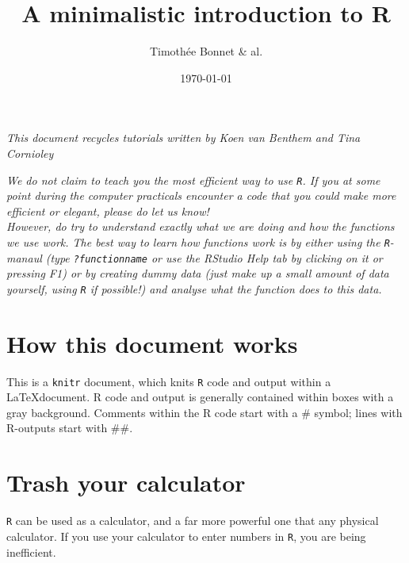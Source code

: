 \documentclass[12pt,a4paper]{scrartcl}\usepackage[]{graphicx}\usepackage[]{color}
\title{A minimalistic introduction to R}
\date{\today}
\author{Timothée Bonnet \& al.}
\begin{document}
\maketitle

\textit{This document recycles tutorials written by Koen van Benthem and Tina Cornioley}

\tableofcontents



\vspace{2cm}
\begin{mdframed}
\textit{We do not claim to teach you the most efficient way to use \texttt{R}. If you at some point during the computer practicals encounter a code that you could make more efficient or elegant, please do let us know! \\[1.5ex] 
However, do try to understand exactly what we are doing and how the functions we use work. The best way to learn how functions work is by either using the \texttt{R}-manaul (type \texttt{?functionname} or use the RStudio Help tab by clicking on it or pressing F1) or by creating dummy data (just make up a small amount of data yourself, using \texttt{R} if possible!) and analyse what the function does to this data.}
\end{mdframed}
\newpage

\section*{How this document works}
This is a \texttt{knitr} document, which knits \texttt{R} code and output within a \LaTeX document.
R code and output is generally contained within boxes with a gray background. Comments within the R code start with a \# symbol; lines with R-outputs start with \#\#.

\section{Trash your calculator}
\texttt{R} can be used as a calculator, and a far more powerful one that any physical calculator. If you use your calculator to enter numbers in \texttt{R}, you are being inefficient.
\end{document}
